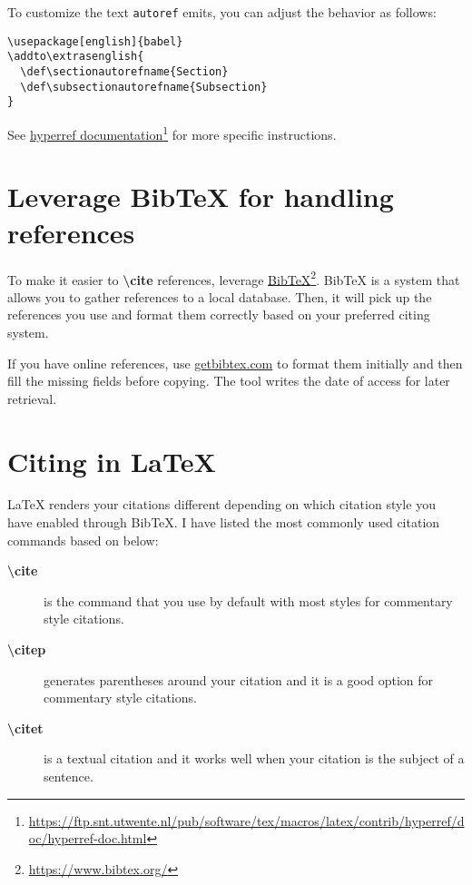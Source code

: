 To customize the text \texttt{autoref} emits, you can adjust the behavior as follows:

\begin{verbatim}
\usepackage[english]{babel}
\addto\extrasenglish{
  \def\sectionautorefname{Section}
  \def\subsectionautorefname{Subsection}
}
\end{verbatim}

See \href{https://ftp.snt.utwente.nl/pub/software/tex/macros/latex/contrib/hyperref/doc/hyperref-doc.html}{hyperref documentation}\footnote{\url{https://ftp.snt.utwente.nl/pub/software/tex/macros/latex/contrib/hyperref/doc/hyperref-doc.html}} for more specific instructions.

\section{Leverage BibTeX for handling references}

To make it easier to \textbf{\textbackslash cite} references, leverage \href{https://www.bibtex.org/}{BibTeX}\footnote{\url{https://www.bibtex.org/}}. BibTeX is a system that allows you to gather references to a local database. 
Then, it will pick up the references you use and format them correctly based on your preferred citing system.

If you have online references, use \href{https://www.getbibtex.com/}{getbibtex.com} to format them initially and then fill the missing fields before copying.
The tool writes the date of access for later retrieval. %

\section{Citing in LaTeX}
\label{sec:citing-in-latex}

LaTeX renders your citations different depending on which citation style you have enabled through BibTeX.
I have listed the most commonly used citation commands based on \citep{natbib2024} below:

\begin{description}
    \item[\textbf{\textbackslash cite}] is the command that you use by default with most styles for commentary style citations.
    \item[\textbf{\textbackslash citep}] generates parentheses around your citation and it is a good option for commentary style citations.
    \item[\textbf{\textbackslash citet}] is a textual citation and it works well when your citation is the subject of a sentence.
\end{description}

